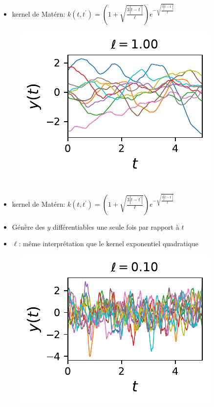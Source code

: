 \documentclass[xcolor=svgnames, t]{beamer}
\begin{document}
\begin{frame}
  \frametitle{\secname}
  
  \begin{itemize}
    \item kernel de Matérn:
    $k (t, t^\prime) = ( 1 + \sqrt{\frac{3 |t - t^\prime|}{\ell} } ) e^{-\sqrt{\frac{3 |t - t^\prime|}{\ell} }}$
  \end{itemize}
  \begin{figure}
    \includegraphics{10_gp_time_MaternKernel_1.00.pdf}
  \end{figure}
\end{frame}

\begin{frame}
  \frametitle{\secname}
  
  \begin{itemize}
    \item kernel de Matérn:
    $k (t, t^\prime) = ( 1 + \sqrt{\frac{3 |t - t^\prime|}{\ell} } ) e^{-\sqrt{\frac{3 |t - t^\prime|}{\ell} }}$
    \item Génère des $y$ différentiables une seule fois par rapport à $t$
    \item $\ell$: même interprétation que le kernel exponentiel quadratique
  \end{itemize}
  \begin{figure}
    \includegraphics{10_gp_time_MaternKernel_0.10.pdf}
  \end{figure}
\end{frame}
\end{document}
